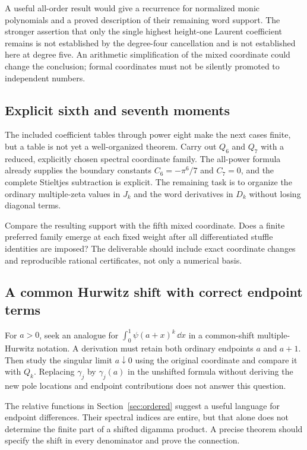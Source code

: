 A useful all-order result would give a recurrence for normalized
monic polynomials and a proved description of their remaining word
support.  The stronger assertion that only the single highest
height-one Laurent coefficient remains is not established by the
degree-four cancellation and is not established here at degree five.
An arithmetic simplification of the mixed coordinate could change
the conclusion; formal coordinates must not be silently promoted to
independent numbers.

\subsection{Explicit sixth and seventh moments}

The included coefficient tables through power eight make the next
cases finite, but a table is not yet a well-organized theorem.
Carry out $Q_6$ and $Q_7$ with a reduced, explicitly chosen spectral
coordinate family.  The all-power formula already supplies the
boundary constants $C_6=-\pi^6/7$ and $C_7=0$, and the complete
Stieltjes subtraction is explicit.  The remaining task is to organize
the ordinary multiple-zeta values in $J_k$ and the word derivatives
in $D_k$ without losing diagonal terms.

Compare the resulting support with the fifth mixed coordinate.
Does a finite preferred family emerge at each fixed weight after
all differentiated stuffle identities are imposed?  The deliverable
should include exact coordinate changes and reproducible rational
certificates, not only a numerical basis.

\subsection{A common Hurwitz shift with correct endpoint terms}

For $a>0$, seek an analogue for
$\int_0^1\psi(a+x)^k\,\dd x$ in a common-shift multiple-Hurwitz
notation.  A derivation must retain both ordinary endpoints
$a$ and $a+1$.  Then study the singular limit $a\downarrow0$
using the original coordinate and compare it with $Q_k$.
Replacing $\gamma_j$ by $\gamma_j(a)$ in the unshifted formula
without deriving the new pole locations and endpoint contributions
does not answer this question.

The relative functions in Section~\ref{sec:ordered} suggest a useful
language for endpoint differences.  Their spectral indices are
entire, but that alone does not determine the finite part of a
shifted digamma product.  A precise theorem should specify the
shift in every denominator and prove the connection.

